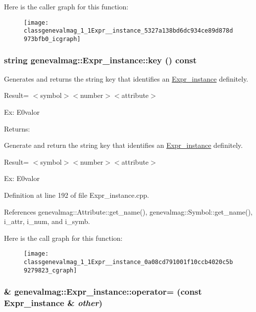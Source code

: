 Here is the caller graph for this function:\nopagebreak
\begin{figure}[H]
\begin{center}
\leavevmode
\texttt{[image: classgenevalmag\_1\_1Expr\_\_instance\_5327a138bd6dc934ce89d878d973bfb0\_icgraph]}
\end{center}
\end{figure}
\hypertarget{classgenevalmag_1_1Expr__instance_0a08cd791001f10ccb4020c5b9279823}{
\subsubsection[{key}]{\setlength{\rightskip}{0pt plus 5cm}string genevalmag::Expr\_\-instance::key () const}}
\label{classgenevalmag_1_1Expr__instance_0a08cd791001f10ccb4020c5b9279823}


Generates and returns the string key that identifies an \hyperlink{classgenevalmag_1_1Expr__instance}{Expr\_\-instance} definitely.\par
 \par
 Result= $<$symbol$>$$<$number$>$$<$attribute$>$\par
 \par
 Ex: E0valor\par
 \begin{Desc}
\item[Returns:]\end{Desc}
Generate and return the string key that identifies an \hyperlink{classgenevalmag_1_1Expr__instance}{Expr\_\-instance} definitely.

Result= $<$symbol$>$$<$number$>$$<$attribute$>$

Ex: E0valor 

Definition at line 192 of file Expr\_\-instance.cpp.

References genevalmag::Attribute::get\_\-name(), genevalmag::Symbol::get\_\-name(), i\_\-attr, i\_\-num, and i\_\-symb.

Here is the call graph for this function:\nopagebreak
\begin{figure}[H]
\begin{center}
\leavevmode
\texttt{[image: classgenevalmag\_1\_1Expr\_\_instance\_0a08cd791001f10ccb4020c5b9279823\_cgraph]}
\end{center}
\end{figure}
\hypertarget{classgenevalmag_1_1Expr__instance_4af9be1f881e4c3aa29d548477fb1c7c}{
\subsubsection[{operator=}]{ \& genevalmag::Expr\_\-instance::operator= (const {\bf Expr\_\-instance} \& {\em other})}}
\label{classgenevalmag_1_1Expr__instance_4af9be1f881e4c3aa29d548477fb1c7c}



